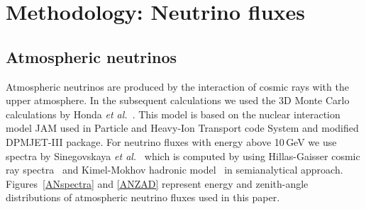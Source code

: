 \section{Methodology: Neutrino fluxes}
\subsection{Atmospheric neutrinos}
Atmospheric neutrinos are produced by the interaction of cosmic rays with the upper atmosphere. In the subsequent calculations we used the 3D Monte Carlo calculations by Honda \textit{et al.}~\cite{Honda:2011nf}. This model is based on the nuclear interaction model JAM used in Particle and Heavy-Ion Transport code System and modified DPMJET-III package. For neutrino fluxes with energy above 10\,GeV we use spectra by Sinegovskaya \textit{et al.}~\cite{Sinegovskaya:2014pia} which is computed by using Hillas-Gaisser cosmic ray spectra~\cite{Gaisser:2013ira} and Kimel-Mokhov hadronic model~\cite{Kalinovsky:1989kk} in semianalytical approach. Figures~\ref{ANspectra} and \ref{ANZAD} represent energy and zenith-angle distributions of atmospheric neutrino fluxes used in this paper.

